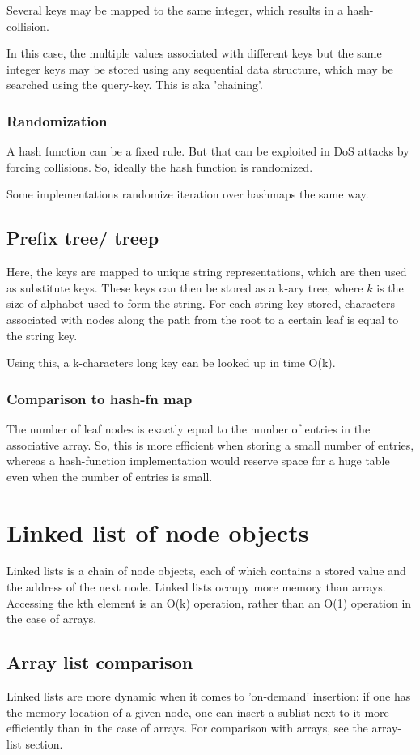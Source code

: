 \documentclass[oneside, article]{memoir}
\begin{document}
Several keys may be mapped to the same integer, which results in a hash-collision.

In this case, the multiple values associated with different keys but the same integer keys may be stored using any sequential data structure, which may be searched using the query-key. This is aka 'chaining'.

\subsubsection{Randomization}
A hash function can be a fixed rule. But that can be exploited in DoS attacks by forcing collisions. So, ideally the hash function is randomized.

Some implementations randomize iteration over hashmaps the same way.

\subsection{Prefix tree/ treep}
Here, the keys are mapped to unique string representations, which are then used as substitute keys. These keys can then be stored as a k-ary tree, where $k$ is the size of alphabet used to form the string. For each string-key stored, characters associated with nodes along the path from the root to a certain leaf is equal to the string key.

Using this, a k-characters long key can be looked up in time O(k).

\subsubsection{Comparison to hash-fn map}
The number of leaf nodes is exactly equal to the number of entries in the associative array. So, this is more efficient when storing a small number of entries, whereas a hash-function implementation would reserve space for a huge table even when the number of entries is small.

\section{Linked list of node objects}
Linked lists is a chain of node objects, each of which contains a stored value and the address of the next node. Linked lists occupy more memory than arrays. Accessing the kth element is an O(k) operation, rather than an O(1) operation in the case of arrays.

\subsection{Array list comparison}
Linked lists are more dynamic when it comes to 'on-demand' insertion: if one has the memory location of a given node, one can insert a sublist next to it more efficiently than in the case of arrays. For comparison with arrays, see the array-list section.
\end{document}
